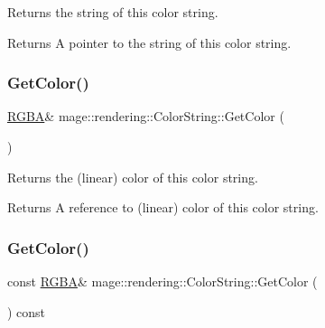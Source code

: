 Returns the string of this color string.

\begin{DoxyReturn}{Returns}
A pointer to the string of this color string. 
\end{DoxyReturn}
\mbox{\label{classmage_1_1rendering_1_1_color_string_a396ed7da3f3b27068b05c1ead9816046}} 
\subsubsection{\texorpdfstring{Get\+Color()}{GetColor()}\hspace{0.1cm}{\footnotesize\ttfamily [1/2]}}
{\footnotesize\ttfamily \mbox{\hyperlink{structmage_1_1_r_g_b_a}{R\+G\+BA}}\& mage\+::rendering\+::\+Color\+String\+::\+Get\+Color (\begin{DoxyParamCaption}{ }\end{DoxyParamCaption})\hspace{0.3cm}{\ttfamily [noexcept]}}

Returns the (linear) color of this color string.

\begin{DoxyReturn}{Returns}
A reference to (linear) color of this color string. 
\end{DoxyReturn}
\mbox{\label{classmage_1_1rendering_1_1_color_string_a08bd67511180f15e902ce34dd402fe82}} 
\subsubsection{\texorpdfstring{Get\+Color()}{GetColor()}\hspace{0.1cm}{\footnotesize\ttfamily [2/2]}}
{\footnotesize\ttfamily const \mbox{\hyperlink{structmage_1_1_r_g_b_a}{R\+G\+BA}}\& mage\+::rendering\+::\+Color\+String\+::\+Get\+Color (\begin{DoxyParamCaption}{ }\end{DoxyParamCaption}) const\hspace{0.3cm}{\ttfamily [noexcept]}}

